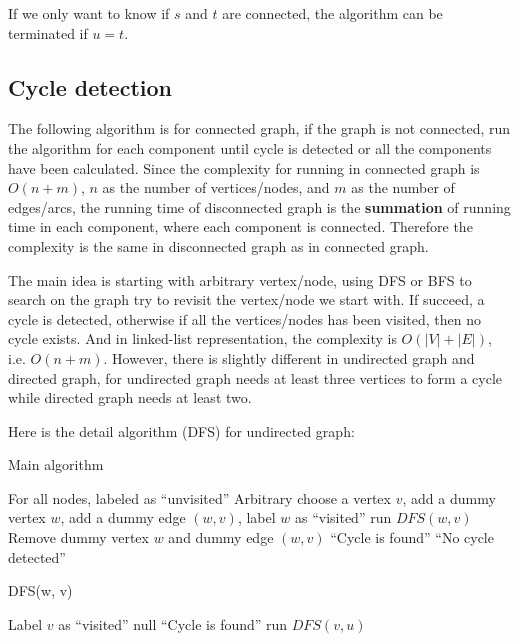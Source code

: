 				If we only want to know if $s$ and $t$ are connected, the algorithm can be terminated if $u = t$.

			\subsection{Cycle detection}
				The following algorithm is for connected graph, if the graph is not connected, run the algorithm for each component until cycle is detected or all the components have been calculated. Since the complexity for running in connected graph is $O(n + m)$, $n$ as the number of vertices/nodes, and $m$ as the number of edges/arcs, the running time of disconnected graph is the \textbf{summation} of running time in each component, where each component is connected. Therefore the complexity is the same in disconnected graph as in connected graph.

				The main idea is starting with arbitrary vertex/node, using DFS or BFS to search on the graph try to revisit the vertex/node we start with. If succeed, a cycle is detected, otherwise if all the vertices/nodes has been visited, then no cycle exists. And in linked-list representation, the complexity is $O(|V| + |E|)$, i.e. $O(n + m)$. However, there is slightly different in undirected graph and directed graph, for undirected graph needs at least three vertices to form a cycle while directed graph needs at least two.

				Here is the detail algorithm (DFS) for undirected graph:
				\begin{algorithm}[H]
					\caption{Main algorithm}
					\begin{algorithmic}[1]
						\State For all nodes, labeled as ``unvisited''
						\State Arbitrary choose a vertex $v$, add a dummy vertex $w$, add a dummy edge $(w, v)$, label $w$ as ``visited''
						\State run $DFS(w, v)$
						\State Remove dummy vertex $w$ and dummy edge $(w, v)$
							\State \Return ``Cycle is found''
						\Else
							\State \Return ``No cycle detected''
						\EndIf
					\end{algorithmic}
				\end{algorithm}

				\begin{algorithm}[H]
					\caption{DFS(w, v)}
					\begin{algorithmic}[1]
						\State Label $v$ as ``visited''
							\State \Return null
						\Else
									\State \Return ``Cycle is found'' 
								\Else
									\State run $DFS(v, u)$
								\EndIf
							\EndFor
						\EndIf
					\end{algorithmic}
				\end{algorithm}

